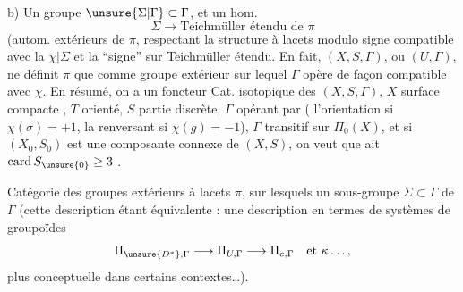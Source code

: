 b) Un  groupe $\unsure{\Sigma|\Gamma}\subset\Gamma$, et
un hom.
\[
\Sigma\longrightarrow\text{Teichmüller étendu de }\pi
\]
(autom. extérieurs de $\pi$,
respectant la structure à lacets
modulo signe
compatible avec la  $\chi|\Sigma$ et
la  ``signe'' sur Teichmüller étendu.
En fait, $(X,S,\Gamma)$, ou $(U,\Gamma)$, ne définit
$\pi$ que comme groupe extérieur  sur lequel
$\Gamma$ opère de façon compatible avec $\chi$.
En résumé, on a un foncteur 
Cat. isotopique des \((X,S,\Gamma)\), \(X\) surface compacte ,
\(T\) orienté, \(S\) partie discrète, \(\Gamma\) opérant par 
(\inserted{\(\sigma\in\Gamma\)} l'orientation si \(\chi(\sigma)=+1\), la renversant
si \(\chi(g)=-1\)), \(\Gamma\) transitif sur \(\Pi_0(X)\),
 et si \((X_0,S_0)\) est une composante connexe
de \((X,S)\), on veut que 
ait \(\operatorname{card} S_{\unsure{0}}\geq 3\) .

\diagram{\begin{tikzcd}[row sep=2.5em]
{} \arrow[d] \\
{}
\end{tikzcd}}

Catégorie des groupes extérieurs à lacets \(\pi\),
sur lesquels un sous-groupe \(\Sigma\subset\Gamma\) de \(\Gamma\) 
(cette description étant
équivalente : une description en termes
de systèmes de groupoïdes
\[
\Pi_{\unsure{D^*},\Gamma}\longrightarrow\Pi_{U,\Gamma}
\longrightarrow\Pi_{e,\Gamma}\quad\text{et }\kappa\ldots,
\]
plus conceptuelle dans certains contextes\ldots).

